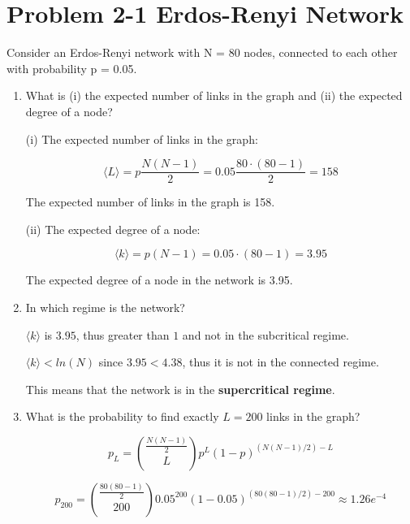\section{Problem 2-1 Erdos-Renyi Network}

Consider an Erdos-Renyi network with N = 80 nodes, connected to each other with probability p = 0.05.

\begin{enumerate}
	\item What is (i) the expected number of links in the graph and (ii) the expected degree of a node?
	\vspace{0.25cm}
	
	(i) The expected number of links in the graph:
	
	\begin{equation}
	\langle L \rangle = p \frac{N(N-1)}{2} = 0.05 \frac{80 \cdot (80 - 1)}{2} = 158
	\end{equation}
	
	The expected number of links in the graph is 158.
	
	(ii) The expected degree of a node:
	
	\begin{equation}
	\langle k \rangle = p(N-1) = 0.05 \cdot (80 -1) = 3.95
	\end{equation}
	
	The expected degree of a node in the network is 3.95.
	
	\item In which regime is the network?
	\vspace{0.25cm}
	
	$\langle k \rangle$ is $3.95$,  thus greater than $1$ and not in the subcritical regime.
	
	$\langle k \rangle < ln(N)$ since $3.95 < 4.38$,  thus it is not in the connected regime.
	
	This means that the network is in the \textbf{supercritical regime}.
	
	\item What is the probability to find exactly $L = 200$ links in the graph?
	\vspace{0.25cm}
	
	\begin{equation}
	p_L = {{\frac{N(N-1)}{2}} \choose {L}} p^L (1-p)^{(N(N-1)/2)-L}
	\end{equation}
	
	\begin{equation}
	p_{200} = {{\frac{80(80-1)}{2}} \choose {200}} 0.05^{200} (1-0.05)^{(80(80-1)/2)-200} \approx 1.26e^{-4}
	\end{equation}
	

\end{enumerate}
